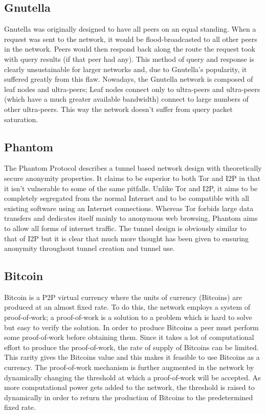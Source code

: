 \documentclass[ %
                    author={Luke Murray},
                supervisor={Dr. Simon Hollis},
                     title={Shadow Peer-to-Peer Networks},
                  subtitle={},
                    degree={MEng},
                      year={2013} ]{thesis}
\begin{document}
\subsection{Gnutella}

Gnutella\cite{Gnutella} was originally designed to have all peers on an equal standing. When a request was sent to the network, it would be flood-broadcasted to all other peers in the network. Peers would then respond back along the route the request took with query results (if that peer had any). This method of query and response is clearly unsustainable for larger networks and, due to Gnutella's popularity, it suffered greatly from this flaw. Nowadays, the Gnutella network is composed of leaf nodes and ultra-peers; Leaf nodes connect only to ultra-peers and ultra-peers (which have a much greater available bandwidth) connect to large numbers of other ultra-peers. This way the network doesn't suffer from query packet saturation.

\subsection{Phantom}

The Phantom Protocol\cite{Phantom} describes a tunnel based network design with theoretically secure anonymity properties. It claims to be superior to both Tor and I2P in that it isn't vulnerable to some of the same pitfalls. Unlike Tor and I2P, it aims to be completely segregated from the normal Internet and to be compatible with all existing software using an Internet connections. Whereas Tor forbids large data transfers and dedicates itself mainly to anonymous web browsing, Phantom aims to allow all forms of internet traffic. The tunnel design is obviously similar to that of I2P but it is clear that much more thought has been given to ensuring anonymity throughout tunnel creation and tunnel use.

\subsection{Bitcoin}

Bitcoin\cite{Bitcoin} is a P2P virtual currency where the units of currency (Bitcoins) are produced at an almost fixed rate. To do this, the network employs a system of proof-of-work; a proof-of-work is a solution to a problem which is hard to solve but easy to verify the solution. In order to produce Bitcoins a peer must perform some proof-of-work before obtaining them. Since it takes a lot of computational effort to produce the proof-of-work, the rate of supply of Bitcoins can be limited. This rarity gives the Bitcoins value and this makes it feasible to use Bitcoins as a currency. The proof-of-work mechanism is further augmented in the network by dynamically changing the threshold at which a proof-of-work will be accepted. As more computational power gets added to the network, the threshold is raised to dynamically in order to return the production of Bitcoins to the predetermined fixed rate.
\end{document}
